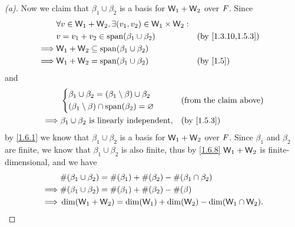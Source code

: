 \begin{proof}[(a)]
  Now we claim that \(\beta_1 \cup \beta_2\) is a basis for \(\mathsf{W}_1 + \mathsf{W}_2\) over \(\mathit{F}\).
  Since
  \begin{align*}
             & \forall v \in \W_1 + \W_2, \exists (v_1, v_2) \in \W_1 \times \W_2 :                                      \\
             & v = v_1 + v_2 \in \spn{\beta_1 \cup \beta_2}                         &  & \text{(by \cref{1.3.10,1.5.3})} \\
    \implies & \W_1 + \W_2 \subseteq \spn{\beta_1 \cup \beta_2}                                                          \\
    \implies & \W_1 + \W_2 = \spn{\beta_1 \cup \beta_2}                             &  & \text{(by \cref{1.5})}
  \end{align*}
  and
  \begin{align*}
             & \begin{dcases}
                 \beta_1 \cup \beta_2 = (\beta_1 \setminus \beta) \cup \beta_2 \\
                 (\beta_1 \setminus \beta) \cap \spn{\beta_2} = \varnothing
               \end{dcases} &  & \text{(from the claim above)}                                  \\
    \implies & \beta_1 \cup \beta_2 \text{ is linearly independent},            &  & \text{(by \cref{1.5.3})}
  \end{align*}
  by \cref{1.6.1} we know that \(\beta_1 \cup \beta_2\) is a basis for \(\mathsf{W}_1 + \mathsf{W}_2\) over \(\mathit{F}\).
  Since \(\beta_1\) and \(\beta_2\) are finite, we know that \(\beta_1 \cup \beta_2\) is also finite, thus by \cref{1.6.8} \(\mathsf{W}_1 + \mathsf{W}_2\) is finite-dimensional, and we have
  \begin{align*}
             & \#(\beta_1 \cup \beta_2) = \#(\beta_1) + \#(\beta_2) - \#(\beta_1 \cap \beta_2) \\
    \implies & \#(\beta_1 \cup \beta_2) = \#(\beta_1) + \#(\beta_2) - \#(\beta)                \\
    \implies & \dim(\mathsf{W}_1 + \mathsf{W}_2) = \dim(\mathsf{W}_1) + \dim(\mathsf{W}_2) - \dim(\mathsf{W}_1 \cap \mathsf{W}_2).
  \end{align*}
\end{proof}

